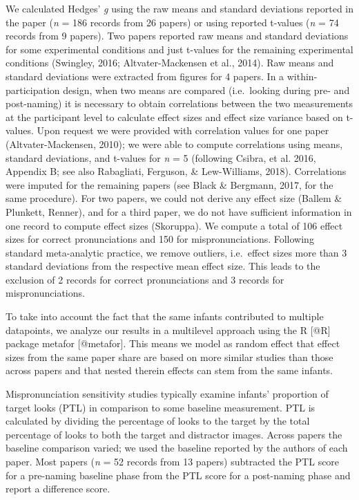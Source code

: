 \documentclass[man]{apa6}
\theoremstyle{definition}
\theoremstyle{definition}
\theoremstyle{definition}
\theoremstyle{remark}
\begin{document}
We calculated Hedges' \emph{g} using the raw means and standard
deviations reported in the paper (\emph{n} = 186 records from 26 papers)
or using reported t-values (\emph{n} = 74 records from 9 papers). Two
papers reported raw means and standard deviations for some experimental
conditions and just t-values for the remaining experimental conditions
(Swingley, 2016; Altvater-Mackensen et al., 2014). Raw means and
standard deviations were extracted from figures for 4 papers. In a
within-participation design, when two means are compared (i.e.~looking
during pre- and post-naming) it is necessary to obtain correlations
between the two measurements at the participant level to calculate
effect sizes and effect size variance based on t-values. Upon request we
were provided with correlation values for one paper (Altvater-Mackensen,
2010); we were able to compute correlations using means, standard
deviations, and t-values for \emph{n} = 5 (following Csibra, et al.
2016, Appendix B; see also Rabagliati, Ferguson, \& Lew-Williams, 2018).
Correlations were imputed for the remaining papers (see Black \&
Bergmann, 2017, for the same procedure). For two papers, we could not
derive any effect size (Ballem \& Plunkett, Renner), and for a third
paper, we do not have sufficient information in one record to compute
effect sizes (Skoruppa). We compute a total of 106 effect sizes for
correct pronunciations and 150 for mispronunciations. Following standard
meta-analytic practice, we remove outliers, i.e.~effect sizes more than
3 standard deviations from the respective mean effect size. This leads
to the exclusion of 2 records for correct pronunciations and 3 records
for mispronunciations.

To take into account the fact that the same infants contributed to
multiple datapoints, we analyze our results in a multilevel approach
using the R {[}@R{]} package metafor {[}@metafor{]}. This means we model
as random effect that effect sizes from the same paper share are based
on more similar studies than those across papers and that nested therein
effects can stem from the same infants.

Mispronunciation sensitivity studies typically examine infants'
proportion of target looks (PTL) in comparison to some baseline
measurement. PTL is calculated by dividing the percentage of looks to
the target by the total percentage of looks to both the target and
distractor images. Across papers the baseline comparison varied; we used
the baseline reported by the authors of each paper. Most papers
(\emph{n} = 52 records from 13 papers) subtracted the PTL score for a
pre-naming baseline phase from the PTL score for a post-naming phase and
report a difference score.
\end{document}
